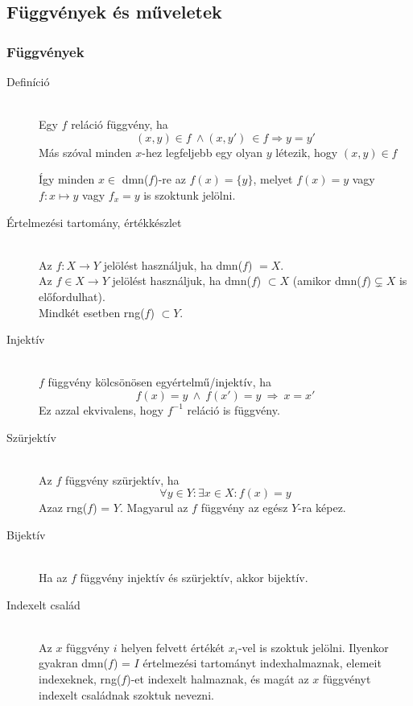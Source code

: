 \documentclass[margin=0px]{article}
\begin{document}
		\subsection{Függvények és műveletek}
			\subsubsection{Függvények}
				\begin{description}
					\item[Definíció] \hfill \\
						Egy $f$ reláció függvény, ha
						\[ (x,y) \in f \ \land (x,y') \ \in f \Longrightarrow y = y' \]
						Más szóval minden $x$-hez legfeljebb egy olyan $y$ létezik, hogy $(x,y) \in f$
						
						Így minden $x \in$ dmn($f$)-re az $f(x) = \{y\}$, melyet $f(x) = y$ vagy $f: x \mapsto y$ vagy $f_x = y$ is szoktunk jelölni.
						
					\item[Értelmezési tartomány, értékkészlet] \hfill \\
						Az $f : X \rightarrow Y$ jelölést használjuk, ha dmn($f$) $ = X $. \\
						Az $f \in X \rightarrow Y$ jelölést használjuk, ha dmn($f$) $\subset X$ (amikor dmn($f$)$ \subsetneq X$ is előfordulhat).\\
						Mindkét esetben rng($f$) $\subset Y$.
							
					\item[Injektív] \hfill \\
						$f$ függvény kölcsönösen egyértelmű/injektív, ha 
						\[ f(x) = y \ \land \ f(x') = y \ \Longrightarrow \ x = x' \]
						Ez azzal ekvivalens, hogy $f^{-1}$ reláció is függvény.
					\item[Szürjektív] \hfill \\
						Az $f$ függvény szürjektív, ha
							\[ \forall y \in Y : \exists x\in X : f(x) = y\]
							Azaz rng($f$) = $Y$. Magyarul az $f$ függvény az egész $Y$-ra képez.
					\item[Bijektív] \hfill \\
						Ha az $f$ függvény injektív és szürjektív, akkor bijektív.
					\item[Indexelt család] \hfill \\
						Az $x$ függvény $i$ helyen felvett értékét $x_i$-vel is szoktuk jelölni. Ilyenkor gyakran dmn($f$) = $I$ értelmezési tartományt indexhalmaznak, elemeit indexeknek, rng($f$)-et indexelt halmaznak, és magát az $x$ függvényt indexelt családnak szoktuk nevezni.
				\end{description}
\end{document}
